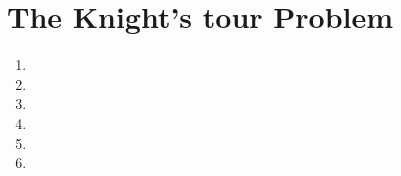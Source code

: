\documentclass[a4paper,10pt]{article}
\begin{document}
\section{The Knight’s tour Problem}

\begin{enumerate}
 \item 
 \item 
 \item 
 \item 
 \item 
 \item 
\end{enumerate}
\end{document}
